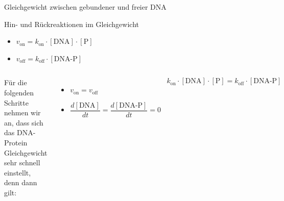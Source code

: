 \documentclass[11pt,aspectratio=169,reqno]{beamer}
\begin{document}
\begin{frame}{Gleichgewicht zwischen gebundener und freier DNA}

    Hin- und Rückreaktionen im Gleichgewicht
    \begin{itemize}
        \item $v_\text{on}=k_\text{on}\cdot [\text{DNA}]\cdot [\text{P}]$
        \item $v_\text{off}=k_\text{off}\cdot [\text{DNA-P}]$\pause
    \end{itemize}

    \vspace{1.5em}

    \begin{columns}[onlytextwidth]
    Für die folgenden Schritte nehmen wir an, dass sich das DNA-Protein Gleichgewicht sehr schnell einstellt, denn dann gilt:
    \begin{itemize}
        \item $v_\text{on}=v_\text{off}$\\[8pt]
        \item $\dfrac{d[\text{DNA}]}{dt}=\dfrac{d[\text{DNA-P}]}{dt}=0$\\[8pt]
    \end{itemize}
    \[k_\text{on}\cdot [\text{DNA}]\cdot [\text{P}]=k_\text{off}\cdot [\text{DNA-P}]\]
    \end{columns}
\end{frame}
\end{document}
